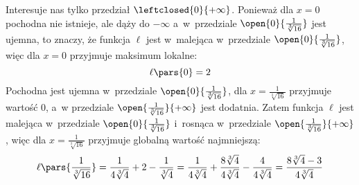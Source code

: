 Interesuje nas tylko przedział \(\leftclosed{0}{+\infty}\). Ponieważ dla \(x = 0\) pochodna nie istnieje, ale dąży do \(-\infty\) a~w~przedziale \(\open{0}{\frac{1}{\sqrt[3]{16}}}\) jest ujemna, to znaczy, że funkcja \(\ell\) jest w~malejąca w~przedziale \(\open{0}{\frac{1}{\sqrt[3]{16}}}\), więc dla \(x = 0\) przyjmuje maksimum lokalne:
\begin{equation*}
    \ell\pars{0} = 2
\end{equation*}
Pochodna jest ujemna w~przedziale \(\open{0}{\frac{1}{\sqrt[3]{16}}}\), dla \(x = \frac{1}{\sqrt[3]{16}}\) przyjmuje wartość \(0\), a~w przedziale \(\open{\frac{1}{\sqrt[3]{16}}}{+\infty}\) jest dodatnia. Zatem funkcja \(\ell\) jest malejąca w~przedziale \(\open{0}{\frac{1}{\sqrt[3]{16}}}\) i~rosnąca w~przedziale \(\open{\frac{1}{\sqrt[3]{16}}}{+\infty}\), więc dla \(x = \frac{1}{\sqrt[3]{16}}\) przyjmuje globalną wartość najmniejszą:
\begin{equation*}
    \ell\pars{\frac{1}{\sqrt[3]{16}}}
        = \frac{1}{4\sqrt[3]{4}} + 2 - \frac{1}{\sqrt[3]{4}}
        = \frac{1}{4\sqrt[3]{4}} + \frac{8\sqrt[3]{4}}{4\sqrt[3]{4}} - \frac{4}{4\sqrt[3]{4}}
        = \frac{8\sqrt[3]{4} - 3}{4\sqrt[3]{4}}
\end{equation*}

